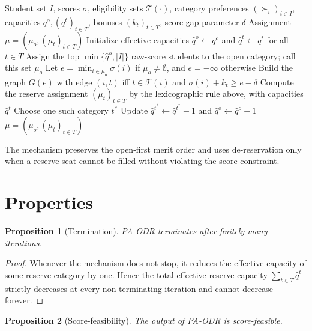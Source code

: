 \documentclass[10pt]{article}
\newtheorem{proposition}{Proposition}
\newcommand{\T}{\mathcal{T}}
\begin{document}
\begin{algorithm}[H]
\caption{Preference-Aware Overlapping De-Reservation (PA-ODR)}
\label{alg:paodr-short}
\small
\begin{algorithmic}[1]
\Require Student set $I$, scores $\sigma$, eligibility sets $\T(\cdot)$, category preferences $(\succ_i)_{i\in I}$, capacities $q^o,(q^t)_{t\in T}$, bonuses $(k_t)_{t\in T}$, score-gap parameter $\delta$
\Ensure Assignment $\mu=(\mu_o,(\mu_t)_{t\in T})$
\State Initialize effective capacities $\hat q^o\gets q^o$ and $\hat q^t\gets q^t$ for all $t\in T$
\Loop
    \State Assign the top $\min\{\hat q^o,|I|\}$ raw-score students to the open category; call this set $\mu_o$
    \State Let $e=\min_{i\in\mu_o}\sigma(i)$ if $\mu_o\neq\emptyset$, and $e=-\infty$ otherwise
    \State Build the graph $G(e)$ with edge $(i,t)$ iff $t\in\T(i)$ and $\sigma(i)+k_t\ge e-\delta$
    \State Compute the reserve assignment $(\mu_t)_{t\in T}$ by the lexicographic rule above, with capacities $\hat q^t$
        \State Choose one such category $t^\ast$
        \State Update $\hat q^{t^\ast}\gets \hat q^{t^\ast}-1$ and $\hat q^o\gets \hat q^o+1$
    \Else
        \State \Return $\mu=(\mu_o,(\mu_t)_{t\in T})$
    \EndIf
\EndLoop
\end{algorithmic}
\end{algorithm}

The mechanism preserves the open-first merit order and uses de-reservation only when a reserve seat cannot be filled without violating the score constraint.

\section{Properties}

\begin{proposition}[Termination]
\label{prop:paodr-termination-short}
PA-ODR terminates after finitely many iterations.
\end{proposition}

\begin{proof}
Whenever the mechanism does not stop, it reduces the effective capacity of some reserve category by one. Hence the total effective reserve capacity $\sum_{t\in T}\hat q^t$ strictly decreases at every non-terminating iteration and cannot decrease forever.
\end{proof}

\begin{proposition}[Score-feasibility]
\label{prop:paodr-score-short}
The output of PA-ODR is score-feasible.
\end{proposition}
\end{document}
